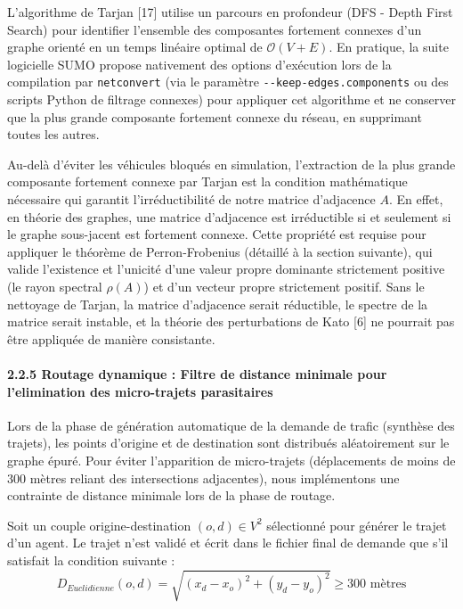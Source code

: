 \documentclass[10pt, a4paper]{article}
\begin{document}
L'algorithme de Tarjan {[}17{]} utilise un parcours en profondeur (DFS -
Depth First Search) pour identifier l'ensemble des composantes fortement
connexes d'un graphe orienté en un temps linéaire optimal de
\(\mathcal{O}(V + E)\). En pratique, la suite logicielle SUMO propose
nativement des options d'exécution lors de la compilation par
\texttt{netconvert} (via le paramètre \texttt{-\/-keep-edges.components}
ou des scripts Python de filtrage connexes) pour appliquer cet
algorithme et ne conserver que la plus grande composante fortement
connexe du réseau, en supprimant toutes les autres.

Au-delà d'éviter les véhicules bloqués en simulation, l'extraction de la
plus grande composante fortement connexe par Tarjan est la condition
mathématique nécessaire qui garantit l'irréductibilité de notre matrice
d'adjacence \(A\). En effet, en théorie des graphes, une matrice
d'adjacence est irréductible si et seulement si le graphe sous-jacent
est fortement connexe. Cette propriété est requise pour appliquer le
théorème de Perron-Frobenius (détaillé à la section suivante), qui
valide l'existence et l'unicité d'une valeur propre dominante
strictement positive (le rayon spectral \(\rho(A)\)) et d'un vecteur
propre strictement positif. Sans le nettoyage de Tarjan, la matrice
d'adjacence serait réductible, le spectre de la matrice serait instable,
et la théorie des perturbations de Kato {[}6{]} ne pourrait pas être
appliquée de manière consistante.

\paragraph{2.2.5 Routage dynamique : Filtre de distance minimale pour
l'elimination des micro-trajets
parasitaires}\label{routage-dynamique-filtre-de-distance-minimale-pour-lelimination-des-micro-trajets-parasitaires}

Lors de la phase de génération automatique de la demande de trafic
(synthèse des trajets), les points d'origine et de destination sont
distribués aléatoirement sur le graphe épuré. Pour éviter l'apparition
de micro-trajets (déplacements de moins de 300 mètres reliant des
intersections adjacentes), nous implémentons une contrainte de distance
minimale lors de la phase de routage.

Soit un couple origine-destination \((o, d) \in V^2\) sélectionné pour
générer le trajet d'un agent. Le trajet n'est validé et écrit dans le
fichier final de demande que s'il satisfait la condition suivante :
\[D_{Euclidienne}(o, d) = \sqrt{(x_d - x_o)^2 + (y_d - y_o)^2} \ge 300 \text{ mètres}\]
\end{document}
